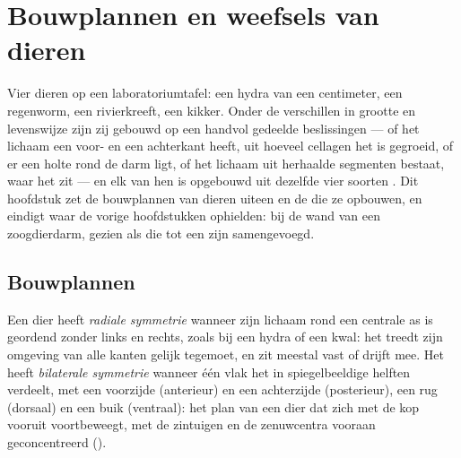 \chapter{Bouwplannen en weefsels van dieren}\label{ch:b1:body-plans-tissues}

Vier dieren op een laboratoriumtafel: een hydra van een centimeter, een
regenworm, een rivierkreeft, een kikker. Onder de verschillen in grootte en
levenswijze zijn zij gebouwd op een handvol gedeelde beslissingen --- of het
lichaam een voor- en een achterkant heeft, uit hoeveel cellagen het is gegroeid,
of er een holte rond de darm ligt, of het lichaam uit herhaalde segmenten
bestaat, waar het  zit --- en elk van hen is opgebouwd uit dezelfde vier
soorten . Dit hoofdstuk zet de bouwplannen van dieren uiteen en de
 die ze opbouwen, en eindigt waar de vorige hoofdstukken ophielden: bij
de wand van een zoogdierdarm, gezien als  die tot een  zijn
samengevoegd.

\section{Bouwplannen}

\begin{definition}\label{def:b1:body-plans-tissues:symmetry}
Een dier heeft \emph{radiale symmetrie} wanneer zijn
lichaam rond een centrale as is geordend zonder links en rechts, zoals bij een
hydra of een kwal: het treedt zijn omgeving van alle kanten gelijk tegemoet, en
zit meestal vast of drijft mee. Het heeft \emph{bilaterale
symmetrie} wanneer één vlak het in spiegelbeeldige
helften verdeelt, met een voorzijde (anterieur) en een achterzijde (posterieur),
een rug (dorsaal) en een buik (ventraal): het plan van een dier dat zich met de
kop vooruit voortbeweegt, met de zintuigen en de zenuwcentra vooraan
geconcentreerd ().
\end{definition}

